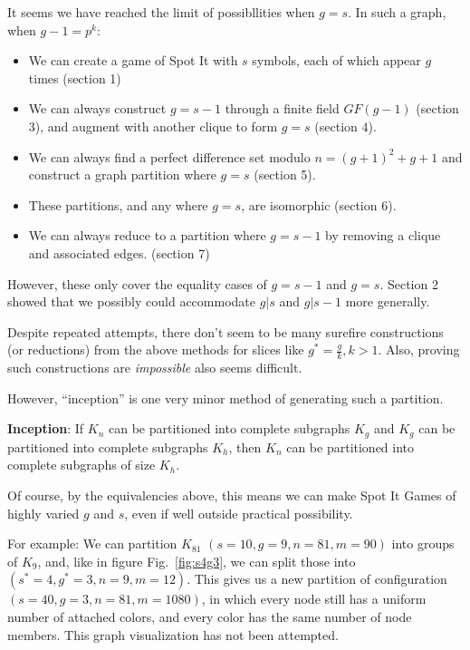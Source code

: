 \documentclass[11pt, oneside]{article} 	%
\begin{document}
It seems we have reached the limit of possibllities when $g=s$. In such a graph, when $g-1 = p^k$:
\begin{itemize}
\item We can create a game of Spot It with $s$ symbols, each of which appear $g$ times (section 1)
\item We can always construct $g=s-1$ through a finite field $GF(g-1)$ (section 3), and augment with another clique to form $g=s$ (section 4).
\item We can always find a perfect difference set modulo $n = (g+1)^2+g+1$ and construct a graph partition where $g=s$ (section 5).
\item These partitions, and any where $g=s$, are isomorphic (section 6).
\item We can always reduce to a partition where $g=s-1$ by removing a clique and associated edges. (section 7)
\end{itemize}

However, these only cover the equality cases of $g=s-1$ and $g=s$. Section 2 showed that we possibly could accommodate $g | s$ and $g | s-1$ more generally.

Despite repeated attempts, there don't seem to be many surefire constructions (or reductions) from the above methods for slices like $g^* = \frac{g}{k}, k > 1$. Also, proving such constructions are \emph{impossible} also seems difficult.

However, ``inception'' is one very minor method of generating such a partition. 

\begin{framed}
\textbf{Inception}: If $K_n$ can be partitioned into complete subgraphs $K_g$ and $K_g$ can be partitioned into complete subgraphs $K_h$, then $K_n$ can be partitioned into complete subgraphs of size $K_h$. 
\end{framed}

Of course, by the equivalencies above, this means we can make Spot It Games of highly varied $g$ and $s$, even if well outside practical possibility.

For example: We can partition $K_{81}$ $(s=10, g=9, n=81,m=90)$ into groups of $K_9$, and, like in figure Fig.~\ref{fig:s4g3}, we can split those into $(s^*=4, g^*=3, n=9,m=12)$.  This gives us a new partition of configuration $(s=40,g=3,n=81,m=1080)$, in which every node still has a uniform number of attached colors, and every color has the same number of node members. This graph visualization has not been attempted.
\end{document}
